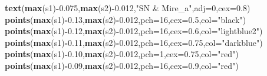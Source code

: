 \documentclass[]{article}
\newenvironment{Shaded}{\begin{snugshade}}{\end{snugshade}}
\newcommand{\DataTypeTok}[1]{\textcolor[rgb]{0.13,0.29,0.53}{#1}}
\newcommand{\DecValTok}[1]{\textcolor[rgb]{0.00,0.00,0.81}{#1}}
\newcommand{\FloatTok}[1]{\textcolor[rgb]{0.00,0.00,0.81}{#1}}
\newcommand{\KeywordTok}[1]{\textcolor[rgb]{0.13,0.29,0.53}{\textbf{#1}}}
\newcommand{\NormalTok}[1]{#1}
\newcommand{\OperatorTok}[1]{\textcolor[rgb]{0.81,0.36,0.00}{\textbf{#1}}}
\newcommand{\StringTok}[1]{\textcolor[rgb]{0.31,0.60,0.02}{#1}}
\begin{document}
\begin{Shaded}
\begin{Highlighting}[]
\KeywordTok{text}\NormalTok{(}\KeywordTok{max}\NormalTok{(s1)}\OperatorTok{-}\FloatTok{0.075}\NormalTok{,}\KeywordTok{max}\NormalTok{(s2)}\OperatorTok{-}\FloatTok{0.012}\NormalTok{,}\StringTok{"SN & Mire_a"}\NormalTok{,}\DataTypeTok{adj=}\DecValTok{0}\NormalTok{,}\DataTypeTok{cex=}\FloatTok{0.8}\NormalTok{)}
\KeywordTok{points}\NormalTok{(}\KeywordTok{max}\NormalTok{(s1)}\OperatorTok{-}\FloatTok{0.13}\NormalTok{,}\KeywordTok{max}\NormalTok{(s2)}\OperatorTok{-}\FloatTok{0.012}\NormalTok{,}\DataTypeTok{pch=}\DecValTok{16}\NormalTok{,}\DataTypeTok{cex=}\FloatTok{0.5}\NormalTok{,}\DataTypeTok{col=}\StringTok{"black"}\NormalTok{)}
\KeywordTok{points}\NormalTok{(}\KeywordTok{max}\NormalTok{(s1)}\OperatorTok{-}\FloatTok{0.12}\NormalTok{,}\KeywordTok{max}\NormalTok{(s2)}\OperatorTok{-}\FloatTok{0.012}\NormalTok{,}\DataTypeTok{pch=}\DecValTok{16}\NormalTok{,}\DataTypeTok{cex=}\FloatTok{0.6}\NormalTok{,}\DataTypeTok{col=}\StringTok{"lightblue2"}\NormalTok{)}
\KeywordTok{points}\NormalTok{(}\KeywordTok{max}\NormalTok{(s1)}\OperatorTok{-}\FloatTok{0.11}\NormalTok{,}\KeywordTok{max}\NormalTok{(s2)}\OperatorTok{-}\FloatTok{0.012}\NormalTok{,}\DataTypeTok{pch=}\DecValTok{16}\NormalTok{,}\DataTypeTok{cex=}\FloatTok{0.75}\NormalTok{,}\DataTypeTok{col=}\StringTok{"darkblue"}\NormalTok{)}
\KeywordTok{points}\NormalTok{(}\KeywordTok{max}\NormalTok{(s1)}\OperatorTok{-}\FloatTok{0.10}\NormalTok{,}\KeywordTok{max}\NormalTok{(s2)}\OperatorTok{-}\FloatTok{0.012}\NormalTok{,}\DataTypeTok{pch=}\DecValTok{1}\NormalTok{,}\DataTypeTok{cex=}\FloatTok{0.75}\NormalTok{,}\DataTypeTok{col=}\StringTok{"red"}\NormalTok{)}
\KeywordTok{points}\NormalTok{(}\KeywordTok{max}\NormalTok{(s1)}\OperatorTok{-}\FloatTok{0.09}\NormalTok{,}\KeywordTok{max}\NormalTok{(s2)}\OperatorTok{-}\FloatTok{0.012}\NormalTok{,}\DataTypeTok{pch=}\DecValTok{16}\NormalTok{,}\DataTypeTok{cex=}\FloatTok{0.9}\NormalTok{,}\DataTypeTok{col=}\StringTok{"red"}\NormalTok{)}


\end{Highlighting}
\end{Shaded}
\end{document}
